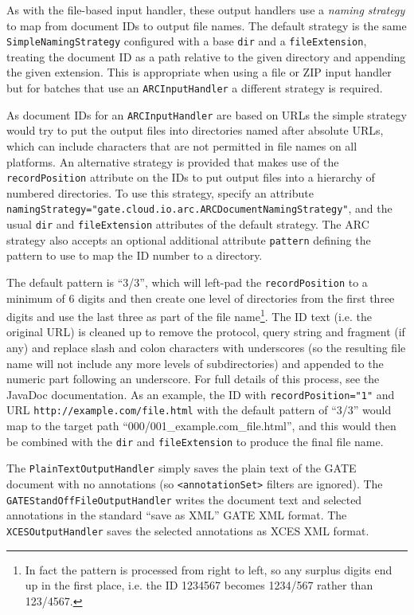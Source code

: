 As with the file-based input handler, these output handlers use a {\em naming
strategy} to map from document IDs to output file names.  The default strategy
is the same \verb!SimpleNamingStrategy! configured with a base \verb!dir! and a
\verb!fileExtension!, treating the document ID as a path relative to the given
directory and appending the given extension.  This is appropriate when using a
file or ZIP input handler but for batches that use an \verb!ARCInputHandler! a
different strategy is required.

As document IDs for an \verb!ARCInputHandler! are based on URLs the simple
strategy would try to put the output files into directories named after
absolute URLs, which can include characters that are not permitted in file
names on all platforms.  An alternative strategy is provided that makes use of
the \verb!recordPosition! attribute on the IDs to put output files into a
hierarchy of numbered directories.  To use this strategy, specify an attribute
\verb!namingStrategy="gate.cloud.io.arc.ARCDocumentNamingStrategy"!, and the
usual \verb!dir! and \verb!fileExtension! attributes of the default strategy.
The ARC strategy also accepts an optional additional attribute \verb!pattern!
defining the pattern to use to map the ID number to a directory.

The default pattern is ``3/3'', which will left-pad the \verb!recordPosition!
to a minimum of 6 digits and then create one level of directories from the
first three digits and use the last three as part of the file name\footnote{In
fact the pattern is processed from right to left, so any surplus digits end up
in the first place, i.e. the ID 1234567 becomes 1234/567 rather than
123/4567.}.  The ID text (i.e. the original URL) is cleaned up to remove the
protocol, query string and fragment (if any) and replace slash and colon
characters with underscores (so the resulting file name will not include any
more levels of subdirectories) and appended to the numeric part following an
underscore.  For full details of this process, see the JavaDoc
documentation.  As an example, the ID with \verb!recordPosition="1"! and URL
\verb!http://example.com/file.html! with the default pattern of ``3/3'' would
map to the target path ``000/001\_example.com\_file.html'', and this
would then be combined with the \verb!dir! and \verb!fileExtension! to produce
the final file name.

The \verb!PlainTextOutputHandler! simply saves the plain text of the GATE
document with no annotations (so \verb!<annotationSet>! filters are ignored).
The \verb!GATEStandOffFileOutputHandler! writes the document text and selected
annotations in the standard ``save as XML'' GATE XML format.  The
\verb!XCESOutputHandler! saves the selected annotations as XCES XML format.

